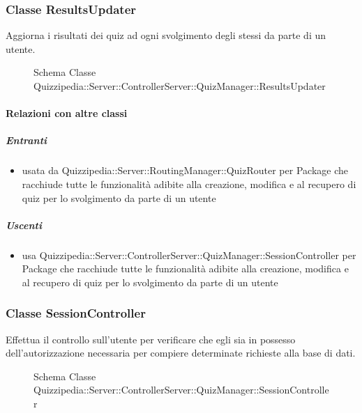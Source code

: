 \subsubsection{Classe ResultsUpdater}
Aggiorna i risultati dei quiz ad ogni svolgimento degli stessi da parte di un utente.
\begin{figure}[H]
\centering
\noindent{}
\caption[Schema Classe ResultsUpdater]{Schema Classe Quizzipedia::Server::ControllerServer::QuizManager::ResultsUpdater}
\end{figure}
\paragraph{Relazioni con altre classi}
\subparagraph{Entranti}
\begin{itemize}
\item usata da Quizzipedia::Server::RoutingManager::QuizRouter per Package che racchiude tutte le funzionalità adibite alla creazione, modifica e al recupero di quiz per lo svolgimento da parte di un utente
\end{itemize}
\subparagraph{Uscenti}
\begin{itemize}
\item usa Quizzipedia::Server::ControllerServer::QuizManager::SessionController per Package che racchiude tutte le funzionalità adibite alla creazione, modifica e al recupero di quiz per lo svolgimento da parte di un utente
\end{itemize}
\subsubsection{Classe SessionController}
Effettua il controllo sull'utente per verificare che egli sia in possesso dell'autorizzazione necessaria per compiere determinate richieste alla base di dati.
\begin{figure}[H]
\centering
\noindent{}
\caption[Schema Classe SessionController]{Schema Classe Quizzipedia::Server::ControllerServer::QuizManager::SessionController}
\end{figure}
